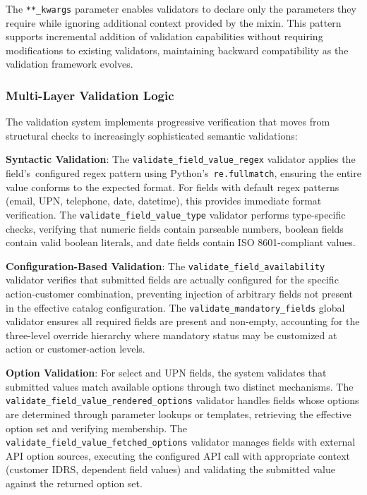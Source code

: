 The \texttt{**\_kwargs} parameter enables validators to declare only the parameters they require while ignoring additional context provided by the mixin. This pattern supports incremental addition of validation capabilities without requiring modifications to existing validators, maintaining backward compatibility as the validation framework evolves.

\subsubsection{Multi-Layer Validation Logic}

The validation system implements progressive verification that moves from structural checks to increasingly sophisticated semantic validations:

\textbf{Syntactic Validation}: The \texttt{validate\_field\_value\_regex} validator applies the field's~configured regex pattern using Python's~\texttt{re.fullmatch}, ensuring the entire value conforms to the expected format. For fields with default regex patterns (email, UPN, telephone, date, datetime), this provides immediate format verification. The \texttt{validate\_field\_value\_type} validator performs type-specific checks, verifying that numeric fields contain parseable numbers, boolean fields contain valid boolean literals, and date fields contain ISO 8601-compliant values.

\textbf{Configuration-Based Validation}: The \texttt{validate\_field\_availability} validator verifies that submitted fields are actually configured for the specific action-customer combination, preventing injection of arbitrary fields not present in the effective catalog configuration. The \texttt{validate\_mandatory\_fields} global validator ensures all required fields are present and non-empty, accounting for the three-level override hierarchy where mandatory status may be customized at action or customer-action levels.

\textbf{Option Validation}: For select and UPN fields, the system validates that submitted values match available options through two distinct mechanisms. The \texttt{validate\_field\_value\_rendered\_options} validator handles fields whose options are determined through parameter lookups or templates, retrieving the effective option set and verifying membership. The \texttt{validate\_field\_value\_fetched\_options} validator manages fields with external API option sources, executing the configured API call with appropriate context (customer IDRS, dependent field values) and validating the submitted value against the returned option set.

